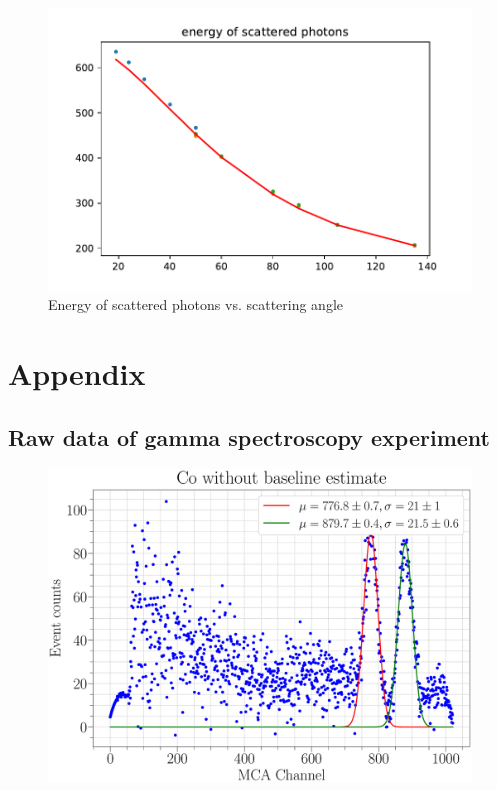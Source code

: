 \documentclass[a4paper,12pt]{article}
\begin{document}
\begin{figure}[H]
\centering
\includegraphics[scale=1]{../Figures/E_Phi.pdf}
\caption{Energy of scattered photons vs. scattering angle}
\label{Ephi}
\end{figure}



\clearpage
\section{Appendix}

\subsection{Raw data of gamma spectroscopy experiment}

\begin{figure}[H]
	\centering
	\includegraphics[scale=0.25]{../Figures/Co_nobaseline.eps}
	\caption{}
	\label{Eu_raw}
\end{figure}
\end{document}
